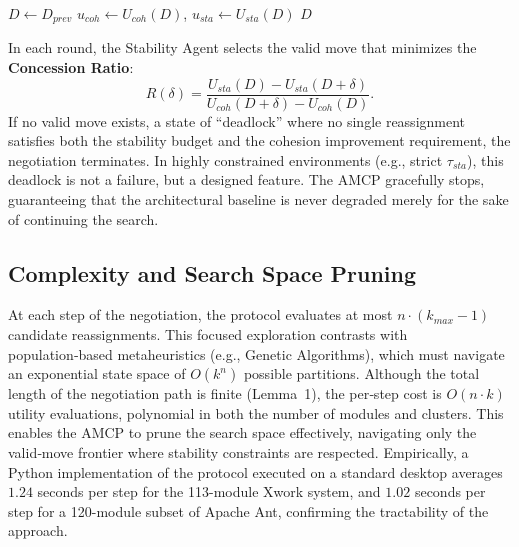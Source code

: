 \documentclass[conference]{IEEEtran}
\begin{document}
\begin{algorithm}[t]
\caption{Asymmetric Monotonic Concession Protocol (AMCP)}
\label{alg:amcp}
$D \leftarrow D_{prev}$\;
$u_{coh} \leftarrow U_{coh}(D)$, $u_{sta} \leftarrow U_{sta}(D)$\;
\Return $D$\;
\end{algorithm}

In each round, the Stability Agent selects the valid move that minimizes the \textbf{Concession Ratio}:
\begin{equation}
R(\delta) = \frac{U_{sta}(D) - U_{sta}(D+\delta)}{U_{coh}(D+\delta)-U_{coh}(D)}.
\label{eq:ratio}
\end{equation}
If no valid move exists, a state of ``deadlock'' where no single reassignment satisfies both the stability budget and the cohesion improvement requirement, the negotiation terminates. In highly constrained environments (e.g., strict $\tau_{sta}$), this deadlock is not a failure, but a designed feature. The AMCP gracefully stops, guaranteeing that the architectural baseline is never degraded merely for the sake of continuing the search.

\subsection{Complexity and Search Space Pruning}
At each step of the negotiation, the protocol evaluates at most $n \cdot (k_{max}-1)$ candidate reassignments. This focused exploration contrasts with population‑based metaheuristics (e.g., Genetic Algorithms), which must navigate an exponential state space of $O(k^n)$ possible partitions. Although the total length of the negotiation path is finite (Lemma~1), the per‑step cost is $O(n \cdot k)$ utility evaluations, polynomial in both the number of modules and clusters. This enables the AMCP to prune the search space effectively, navigating only the valid‑move frontier where stability constraints are respected. Empirically, a Python implementation of the protocol executed on a standard desktop averages $1.24$ seconds per step for the 113-module Xwork system, and $1.02$ seconds per step for a 120-module subset of Apache Ant, confirming the tractability of the approach.
\end{document}
